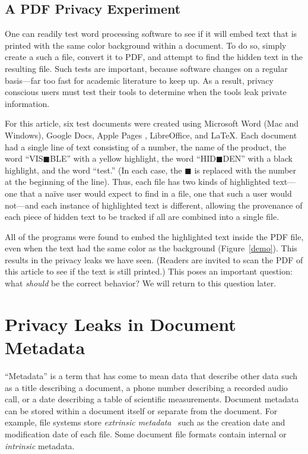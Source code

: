 \subsection{A PDF Privacy Experiment}
One can readily test word processing software to see if it will embed
text that is printed with the same color background within a
document. To do so, simply create a such a file, convert it to
PDF, and attempt to find the hidden text in the resulting file. Such
tests are important, because software changes on a regular basis---far
too fast for academic literature to keep up. As a result, privacy
conscious users must test their tools to
determine when the tools leak private
information.

For this article, six test documents were created using Microsoft Word
(Mac and Windows), Google Docs, Apple Pages , LibreOffice, and \LaTeX.
Each document had a single line of text consisting of a number, the
name of the product, the word ``VIS$\blacksquare$BLE'' with a yellow
highlight, the word ``HID$\blacksquare$DEN'' with a black
highlight, and the word ``test.'' (In each case, the
$\blacksquare$ is replaced with the number at the beginning of the line). Thus, each
file has two kinds of highlighted text---one that a na\"ive user would expect to find in
a file, one that such a user would not---and each instance of highlighted
text is different, allowing the provenance of each piece of hidden
text to be tracked if  all are combined into a single file. 

All of the programs were found to embed the highlighted text inside the
PDF file, even when the text had the same color as the
background (Figure~\ref{demo}). This results in the privacy leaks we
have seen. (Readers are invited to scan the PDF of this article to see
if the text is still printed.) This poses an important
question: what \emph{should} be the correct behavior?  We will return
to this question later.

\section{Privacy Leaks in Document Metadata}

``Metadata'' is a term that has come to mean data that describe other
data such as a title describing a document, a phone number describing
a recorded audio call, or a date describing a table of scientific measurements. Document metadata can be stored within a document itself
or separate from the document. For example, file systems store
\emph{extrinsic metadata}~\cite{garfinkel:ascription} such as the
creation date and modification date of each file. Some document file
formats contain internal or \emph{intrinsic} metadata. 

